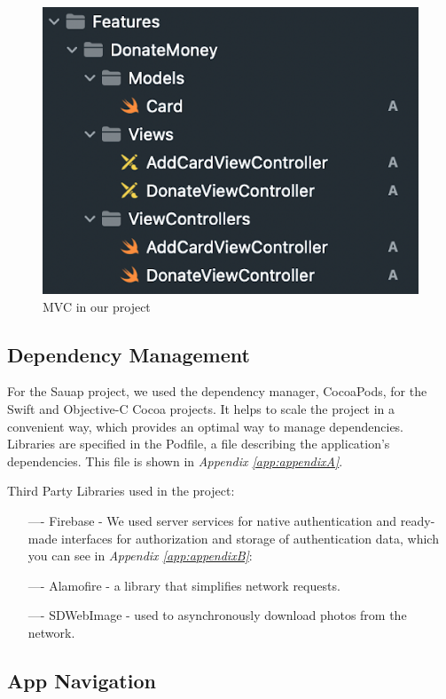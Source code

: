 \begin{figure}[h]
    \centering
    \includegraphics[scale=0.4]{figures/iOS/ios3.png}
    \caption{MVC in our project}
    \label{fig:MVCinourproject}
\end{figure}

\subsection{Dependency Management}

For the Sauap project, we used the dependency manager, CocoaPods, for the Swift and Objective-C Cocoa projects. It helps to scale the project in a convenient way, which provides an optimal way to manage dependencies. Libraries are specified in the Podfile, a file describing the application's dependencies. This file is shown in \textit{Appendix \ref{app:appendixA}}.


Third Party Libraries used in the project:
\begin{itemize}
    \item[----] Firebase - We used server services for native authentication and ready-made interfaces for authorization and storage of authentication data, which you can see in \textit{Appendix \ref{app:appendixB}}:
    \item[----] Alamofire - a library that simplifies network requests.
    \item[----] SDWebImage - used to asynchronously download photos from the network.
\end{itemize}

\subsection{App Navigation}

